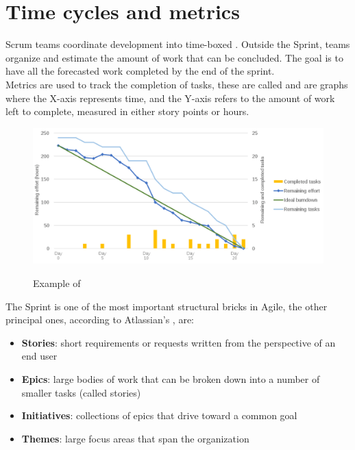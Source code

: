 \section{Time cycles and metrics}
	Scrum teams coordinate development into time-boxed .
	Outside the Sprint, teams organize and estimate the amount of work that can be concluded.
	The goal is to have all the forecasted work completed by the end of the sprint.\\
	Metrics are used to track the completion of tasks, these are called  and are graphs where the X-axis represents time, and the Y-axis refers to the amount of work left to complete, measured in either story points or hours.
	\begin{figure}[H]
		\centering
		\includegraphics[width=.95\textwidth]{resources/burndown}\\
		\caption{Example of }
	\end{figure}
	The Sprint is one of the most important structural bricks in Agile, the other principal ones, according to Atlassian's \cite{epics-stories-themes}, are:
	\begin{itemize}
		\item \textbf{Stories}: short requirements or requests written from the perspective of an end user
		\item \textbf{Epics}: large bodies of work that can be broken down into a number of smaller tasks (called stories)
		\item \textbf{Initiatives}: collections of epics that drive toward a common goal
		\item \textbf{Themes}: large focus areas that span the organization
	\end{itemize}
	\vspace{-.5cm}
